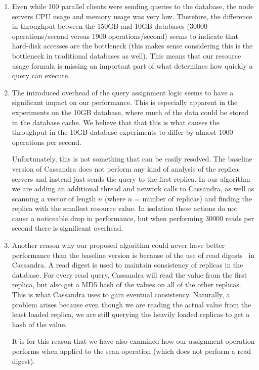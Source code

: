 \begin{enumerate}

\item Even while 100 parallel clients were sending queries to the database, the node servers CPU usage and memory usage was very low. Therefore, the difference in throughput between the 150GB and 10GB databases (30000 operations/second versus 1900 operations/second) seems to indicate that hard-disk accesses are the bottleneck (this makes sense considering this is the bottleneck in traditional databases as well). This means that our resource usage formula is missing an important part of what determines how quickly a query can execute.

\item The introduced overhead of the query assignment logic seems to have a significant impact on our performance. This is especially apparent in the experiments on the 10GB database, where much of the data could be stored in the database cache. We believe that that this is what causes the throughput in the 10GB database experiments to differ by almost 1000 operations per second.

Unfortunately, this is not something that can be easily resolved. The baseline version of Cassandra does not perform any kind of analysis of the replica servers and instead just sends the query to the first replica. In our algorithm we are adding an additional thread and network calls to Cassandra, as well as scanning a vector of length $n$ (where $n$ = number of replicas) and finding the replica with the smallest resource value. In isolation these actions do not cause a noticeable drop in performance, but when performing 30000 reads per second there is significant overhead.

\item Another reason why our proposed algorithm could never have better performance than the baseline version is because of the use of read digests~\cite{readDigest} in Cassandra. A read digest is used to maintain consistency of replicas in the database. For every read query, Cassandra will read the value from the first replica, but also get a MD5 hash of the values on all of the other replicas. This is what Cassandra uses to gain eventual consistency. Naturally, a problem arises because even though we are reading the actual value from the least loaded replica, we are still querying the heavily loaded replicas to get a hash of the value.

It is for this reason that we have also examined how our assignment operation performs when applied to the scan operation (which does not perform a read digest).

\end{enumerate}


